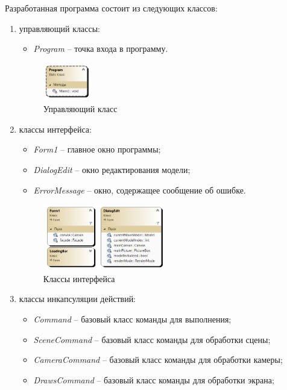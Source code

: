 Разработанная программа состоит из следующих классов:
\begin{enumerate}
	\item управляющий классы:
	\begin{itemize}[label=--]
		\item \textit{Program} -- точка входа в программу.
	\end{itemize}
	\begin{figure}[h] 
		\centering
		\includegraphics[width=0.2\textwidth]{images/main-class.png}
		\caption{Управляющий класс} 
		\label{fig:main-class} 
	\end{figure}
	\item классы интерфейса:
	\begin{itemize}[label=--]
		\item \textit{Form1} -- главное окно программы;
		\item \textit{DialogEdit} -- окно редактирования модели;
		\item \textit{ErrorMessage} -- окно, содержащее сообщение об ошибке.
	\end{itemize}
	\clearpage
	\begin{figure}[h] 
		\centering
		\includegraphics[width=0.5\textwidth]{images/interface-class.png}
		\caption{Классы интерфейса} 
		\label{fig:interface-class} 
	\end{figure}
	\item классы инкапсуляции действий:
	\begin{itemize}[label=--]
		\item \textit{Command} -- базовый класс команды для выполнения;
		\item \textit{SceneCommand} -- базовый класс команды для обработки сцены;
		\item \textit{CameraCommand} -- базовый класс команды для обработки камеры;
		\item \textit{DrawsCommand} -- базовый класс команды для обработки экрана;

\end{itemize}
\end{enumerate}
